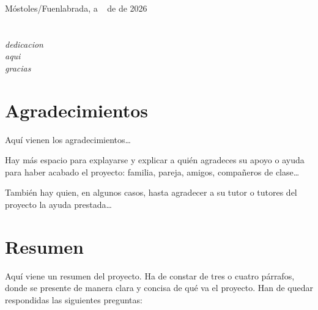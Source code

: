 \documentclass[
paper=a4,
fontsize=12pt,
oneside,
openright,                  %
titlepage,                  %
headsepline,                %
footheight=16pt,            %
parskip=half+,				%
numbers=noenddot,			%
headinclude=true,           %
footinclude=true,           %
cleardoublepage=empty,      %
captions=tableheading,      %
BCOR=5mm, 				    %
DIV=9   			        %
usegeometry=true			%
]{scrbook}
\begin{document}
{\vspace{0.8cm}
\begin{flushright}
Móstoles/Fuenlabrada, a \qquad$\;\,$ de \qquad\qquad\qquad\qquad de 2026
\end{flushright}


\chapter*{}
\begin{flushright}
	\textit{dedicacion\\
		aqui\\
		gracias\\}
\end{flushright}


\chapter*{Agradecimientos}

Aquí vienen los agradecimientos\ldots

Hay más espacio para explayarse y explicar a quién agradeces su apoyo o ayuda para
haber acabado el proyecto: familia, pareja, amigos, compañeros de clase\ldots

También hay quien, en algunos casos, hasta agradecer a su tutor o tutores del proyecto
la ayuda prestada\ldots


\chapter*{Resumen}

Aquí viene un resumen del proyecto.
Ha de constar de tres o cuatro párrafos, donde se presente de manera clara y concisa de qué va el proyecto. 
Han de quedar respondidas las siguientes preguntas:

}
\end{document}
